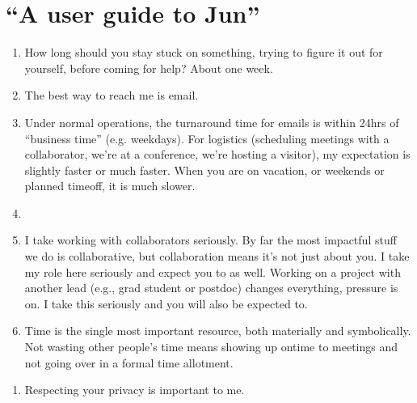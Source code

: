 \documentclass[letterpaper,10pt,english]{sphinxmanual}
\begin{document}
\section{“A user guide to Jun”}
\label{\detokenize{06UserGuideToJun:a-user-guide-to-jun}}\begin{enumerate}
%
\item {} 
\sphinxAtStartPar
How long should you stay stuck on something, trying to figure it out for yourself, before coming for help? About one week.

\item {} 
\sphinxAtStartPar
The best way to reach me is e\sphinxhyphen{}mail.

\item {} 
\sphinxAtStartPar
Under normal operations, the turnaround time for e\sphinxhyphen{}mails is within 24hrs of “business time” (e.g. weekdays). For logistics (scheduling meetings with a collaborator, we’re at a conference, we’re hosting a visitor), my expectation is slightly faster or much faster. When you are on vacation, or weekends or planned time\sphinxhyphen{}off, it is much slower.

\item {} 
\sphinxAtStartPar
{}

\item {} 
\sphinxAtStartPar
I take working with collaborators seriously.  By far the most impactful stuff we do is collaborative, but collaboration means it’s not just about you. I take my role here seriously and expect you to as well. Working on a project with another lead (e.g., grad student or postdoc) changes everything, pressure is on. I take this seriously and you will also be expected to.

\item {} 
\sphinxAtStartPar
Time is the single most important resource, both materially and symbolically. Not wasting other people’s time means showing up on\sphinxhyphen{}time to meetings and not going over in a formal time allotment.

\end{enumerate}
\begin{enumerate}
%
\setcounter{enumi}{5}
\item {} 
\sphinxAtStartPar
Respecting your privacy is important to me.

\end{enumerate}
\end{document}
